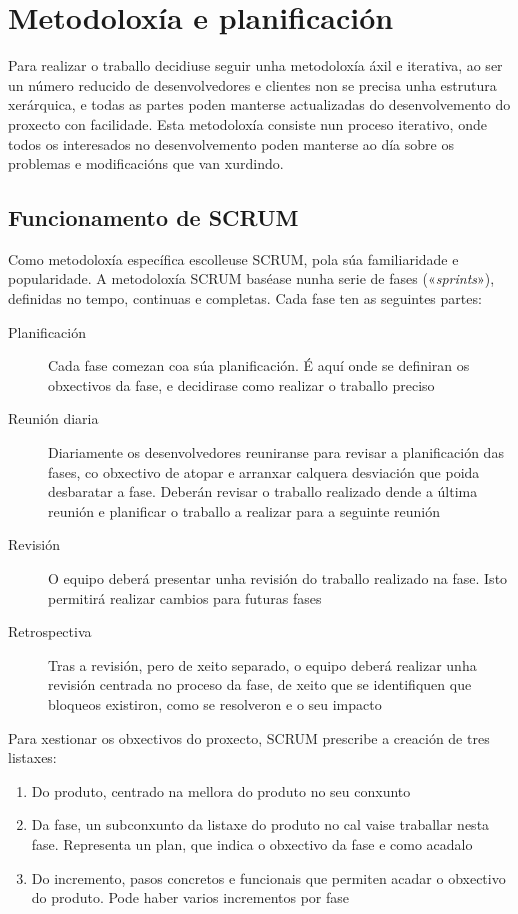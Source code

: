 \chapter{Metodoloxía e planificación}
\label{chap:metodoloxia}

Para realizar o traballo decidiuse seguir unha metodoloxía áxil e iterativa, ao ser un número reducido de desenvolvedores e clientes non se precisa unha estrutura xerárquica, e todas as partes poden manterse actualizadas do desenvolvemento do proxecto con facilidade. Esta metodoloxía consiste nun proceso iterativo, onde todos os interesados no desenvolvemento poden manterse ao día sobre os problemas e modificacións que van xurdindo.

\section{Funcionamento de SCRUM}

Como metodoloxía específica escolleuse SCRUM, pola súa familiaridade e popularidade. A metodoloxía SCRUM\cite{scrum} baséase nunha serie de fases («\textit{sprints}»), definidas no tempo, continuas e completas. Cada fase ten as seguintes partes:

\begin{description}
	\item[Planificación] Cada fase comezan coa súa planificación. É aquí onde se definiran os obxectivos da fase, e decidirase como realizar o traballo preciso
	\item[Reunión diaria] Diariamente os desenvolvedores reuniranse para revisar a planificación das fases, co obxectivo de atopar e arranxar calquera desviación que poida desbaratar a fase. Deberán revisar o traballo realizado dende a última reunión e planificar o traballo a realizar para a seguinte reunión
	\item[Revisión] O equipo deberá presentar unha revisión do traballo realizado na fase. Isto permitirá realizar cambios para futuras fases
	\item[Retrospectiva] Tras a revisión, pero de xeito separado, o equipo deberá realizar unha revisión centrada no proceso da fase, de xeito que se identifiquen que bloqueos existiron, como se resolveron e o seu impacto
\end{description}

\newpage

Para xestionar os obxectivos do proxecto, SCRUM prescribe a creación de tres listaxes:

\begin{enumerate}
	\item Do produto, centrado na mellora do produto no seu conxunto
	\item Da fase, un subconxunto da listaxe do produto no cal vaise traballar nesta fase. Representa un plan, que indica o obxectivo da fase e como acadalo
	\item Do incremento, pasos concretos e funcionais que permiten acadar o obxectivo do produto. Pode haber varios incrementos por fase
\end{enumerate}

